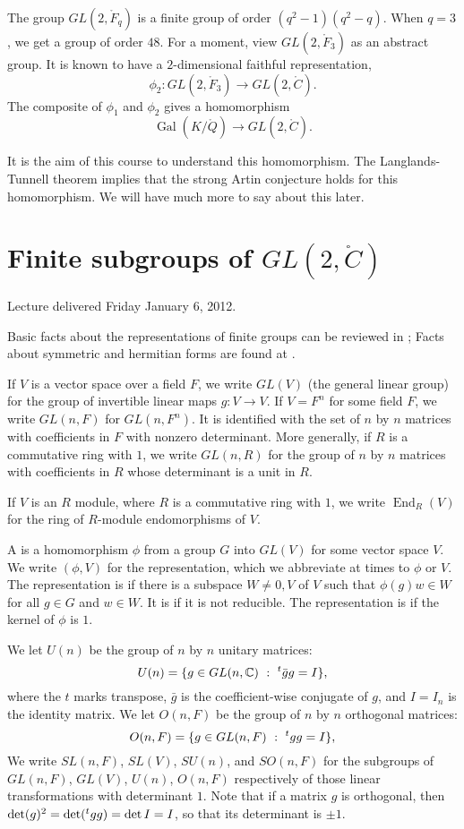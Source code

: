 \documentclass{amsart}
\def\t#1{\hbox{}^t#1}
\def\op#1{{\operatorname{#1}}}
\def\CC{\ring{C}}
\def\oG{\op{Gal}}
\begin{document}
The group $GL(2,\ring{F}_q)$ is a finite group of order
$(q^2-1)(q^2-q)$.  When $q=3$, we get a group of order $48$.  For a
moment, view $GL(2,\ring{F}_3)$ as an abstract group.  It is known
to have a $2$-dimensional faithful representation,
\[
\phi_2 : GL(2,\ring{F}_3) \to GL(2,\CC).
\]
The composite of $\phi_1$ and $\phi_2$ gives a homomorphism
\[
\oG(K/\ring{Q}) \to GL(2,\CC).
\]

It is the aim of this course to understand this homomorphism.  The
Langlands-Tunnell theorem implies that the strong Artin conjecture
holds for this homomorphism.  We will have much more to say about this
later.


\newpage
\section{Finite subgroups of $GL(2,\CC)$}

Lecture delivered Friday January 6, 2012.


Basic facts about the representations of finite groups can be reviewed
in \cite[p.~326, Sec. VII.4]{knapp-basic}; Facts about symmetric and
hermitian 
forms are found at \cite[p.~250,~Sec.~VI.2,~VI.4]{knapp-basic}.

If $V$ is a vector space over a field $F$, we write $GL(V)$ (the
general linear group) for the group of invertible linear maps $g:V\to
V$.  If $V=F^n$ for some field $F$, we write $GL(n,F)$ for
$GL(n,F^n)$.  It is identified with the set of $n$ by $n$ matrices
with coefficients in $F$ with nonzero determinant.  More generally, if
$R$ is a commutative ring with $1$, we write $GL(n,R)$ for the group
of $n$ by $n$ matrices with coefficients in $R$ whose determinant is a
unit in $R$.

If $V$ is an $R$ module, where $R$ is a commutative ring with $1$, 
we write $\op{End}_R(V)$ for the ring of $R$-module endomorphisms of $V$.

A  is a homomorphism $\phi$ from a group $G$
into $GL(V)$ for some vector space $V$.  We write $(\phi,V)$ for the
representation, which we abbreviate at times to $\phi$ or $V$.  
The representation is  if there is
a subspace $W\ne 0,V$ of $V$ such that $\phi(g)w\in W$ for all $g\in
G$ and $w\in W$.  It is  if it is not reducible.
The representation is  if the kernel of $\phi$ is
$1$.

We let $U(n)$ be the group of $n$ by $n$ unitary matrices:
\[
U(n) = \{ g \in GL(n,\CC)  \mid \t{\bar g} g = I\},
\]
where the $t$ marks transpose, $\bar g$ is the coefficient-wise
conjugate of $g$, and $I=I_n$ is the identity matrix.  We let $O(n,F)$
be the group of $n$ by $n$ orthogonal matrices:
\[
O(n,F) = \{ g \in GL(n,F) \mid \t{g} g = I\},
\]
We write $SL(n,F)$, $SL(V)$, $SU(n)$, and $SO(n,F)$ for the subgroups
of $GL(n,F)$, $GL(V)$, $U(n)$, $O(n,F)$ respectively of those linear
transformations with determinant $1$.  Note that if a matrix $g$ is orthogonal,
then $\det(g)^2 = \det(\t{g}g) = \det{I} = I$, so that its determinant is $\pm 1$.
\end{document}
